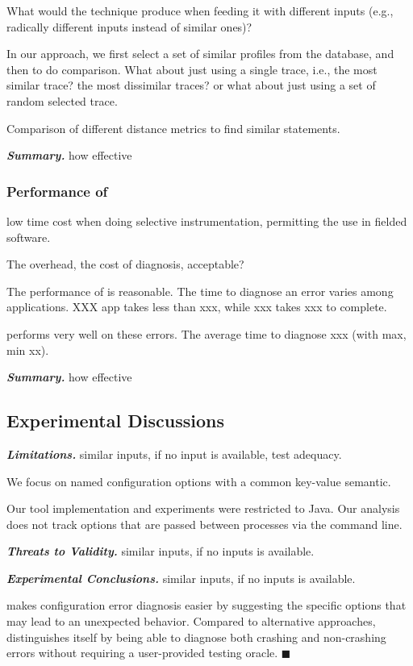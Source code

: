 What would the technique produce when feeding it with different inputs (e.g.,
radically different inputs instead of similar ones)?

In our approach, we first select a set of similar profiles from the  database,
and then to do comparison. What about just using a single trace, i.e., the
most similar trace? the most dissimilar traces? or what about just using a set
of random selected trace.

Comparison of different distance metrics to find similar statements.

\vspace{1mm}
\noindent \textbf{\textit{Summary.}} how effective

\subsubsection{Performance of \ourtool}
low time cost when doing
selective instrumentation, permitting the use in fielded software.

The overhead, the cost of diagnosis, acceptable?

The performance of \ourtool is reasonable. The time to diagnose
an error varies among applications.  XXX app takes less than xxx,
while xxx takes xxx to complete.

\ourtool performs very well on these errors. The average time
to diagnose xxx (with max, min xx).

\vspace{1mm}
\noindent \textbf{\textit{Summary.}} how effective

\vspace{1mm}

\subsection{Experimental Discussions}


\noindent \textbf{\textit{Limitations.}} similar inputs, if no input is available, test adequacy.

We focus on named configuration options with a common key-value semantic.

Our tool implementation and experiments were restricted to Java. Our analysis
does not track options that are passed between processes via the command line.

\vspace{1mm}

\noindent \textbf{\textit{Threats to Validity.}} similar inputs, if no inputs is available.

\vspace{1mm}

\noindent \textbf{\textit{Experimental Conclusions.}} similar inputs, if no inputs is available.

\ourtool makes configuration error diagnosis easier by suggesting
the specific options that may lead to an unexpected behavior. Compared to
alternative approaches, \ourtool distinguishes itself by being able to
diagnose both crashing and non-crashing errors without requiring
a user-provided testing oracle. $\blacksquare$
